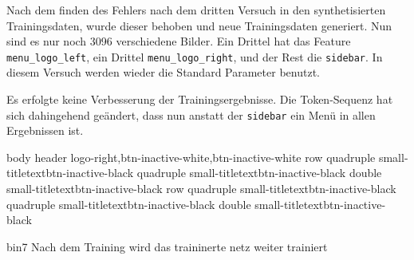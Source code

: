 \documentclass[pdftex,a4paper,halfparskip]{scrartcl}
\begin{document}
Nach dem finden des Fehlers nach dem dritten Versuch in den synthetisierten Trainingsdaten, wurde dieser behoben und neue Trainingsdaten generiert. Nun sind es nur noch 3096 verschiedene Bilder. Ein Drittel hat das Feature \texttt{menu\_logo\_left}, ein Drittel \texttt{menu\_logo\_right}, und der Rest die \texttt{sidebar}. In diesem Versuch werden wieder die Standard Parameter benutzt. 


Es erfolgte keine Verbesserung der Trainingsergebnisse. Die Token-Sequenz hat sich dahingehend geändert, dass nun anstatt der \texttt{sidebar} ein Menü in allen Ergebnissen ist.

\begin{spverbatim}
	body{
	header{
	logo-right,btn-inactive-white,btn-inactive-white
	}
row{
quadruple{
small-titletextbtn-inactive-black
}
quadruple{
small-titletextbtn-inactive-black
}
double{
small-titletextbtn-inactive-black
}
}
row{
quadruple{
small-titletextbtn-inactive-black
}
quadruple{
small-titletextbtn-inactive-black
}
double{
small-titletextbtn-inactive-black
}
}
}
\end{spverbatim}


bin7
Nach dem Training wird das traininerte netz weiter trainiert 
\end{document}

